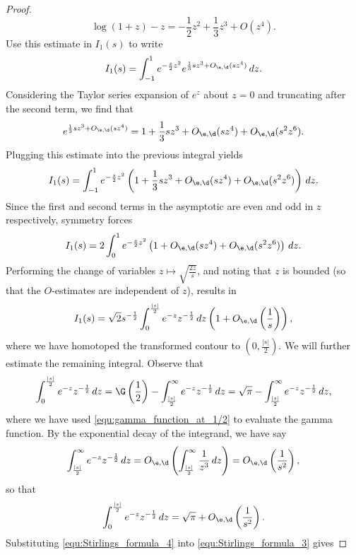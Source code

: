 \documentclass[12pt]{article}
\begin{document}
\begin{proof}
        \[
          \log(1+z)-z = -\frac{1}{2}z^{2}+\frac{1}{3}z^{3}+O(z^{4}).
        \]
        Use this estimate in \(I_{1}(s)\) to write
        \[
          I_{1}(s) = \int_{-1}^{1}e^{-\frac{s}{2}z^{2}}e^{\frac{1}{3}sz^{3}+O_{\e,\d}(sz^{4})}\,dz.
        \]
          Considering the Taylor series expansion of \(e^{z}\) about \(z = 0\) and truncating after the second term, we find that
        \[
          e^{\frac{1}{3}sz^{3}+O_{\e,\d}(sz^{4})} = 1+\frac{1}{3}sz^{3}+O_{\e,\d}(sz^{4})+O_{\e,\d}(s^{2}z^{6}).
        \]
        Plugging this estimate into the previous integral yields
        \[
          I_{1}(s) = \int_{-1}^{1}e^{-\frac{s}{2}z^{2}}\left(1+\frac{1}{3}sz^{3}+O_{\e,\d}(sz^{4})+O_{\e,\d}(s^{2}z^{6})\right)\,dz.
        \]
        Since the first and second terms in the asymptotic are even and odd in \(z\) respectively, symmetry forces
        \[
          I_{1}(s) = 2\int_{0}^{1}e^{-\frac{s}{2}z^{2}}\left(1+O_{\e,\d}(sz^{4})+O_{\e,\d}(s^{2}z^{6})\right)\,dz.
        \]
        Performing the change of variables \(z \mapsto \sqrt{\frac{2z}{s}}\), and noting that \(z\) is bounded (so that the \(O\)-estimates are independent of \(z\)), results in
        \begin{equation}\label{equ:Stirlings_formula_3}
          I_{1}(s) = \sqrt{2}s^{-\frac{1}{2}}\int_{0}^{\frac{|s|}{2}}e^{-z}z^{-\frac{1}{2}}\,dz\left(1+O_{\e,\d}\left(\frac{1}{s}\right)\right),
        \end{equation}
        where we have homotoped the transformed contour to \(\left(0,\frac{|s|}{2}\right)\). We will further estimate the remaining integral. Observe that
        \[
          \int_{0}^{\frac{|s|}{2}}e^{-z}z^{-\frac{1}{2}}\,dz = \G\left(\frac{1}{2}\right)-\int_{\frac{|s|}{2}}^{\infty}e^{-z}z^{-\frac{1}{2}}\,dz = \sqrt{\pi}-\int_{\frac{|s|}{2}}^{\infty}e^{-z}z^{-\frac{1}{2}}\,dz,
        \]
        where we have used \cref{equ:gamma_function_at_1/2} to evaluate the gamma function. By the exponential decay of the integrand, we have say
        \[
          \int_{\frac{|s|}{2}}^{\infty}e^{-z}z^{-\frac{1}{2}}\,dz = O_{\e,\d}\left(\int_{\frac{|s|}{2}}^{\infty}\frac{1}{z^{3}}\,dz\right) = O_{\e,\d}\left(\frac{1}{s^{2}}\right),
        \]
        so that 
        \begin{equation}\label{equ:Stirlings_formula_4}
          \int_{0}^{\frac{|s|}{2}}e^{-z}z^{-\frac{1}{2}}\,dz = \sqrt{\pi}+O_{\e,\d}\left(\frac{1}{s^{2}}\right).
        \end{equation}
        Substituting \cref{equ:Stirlings_formula_4} into \cref{equ:Stirlings_formula_3} gives

\end{proof}
\end{document}
